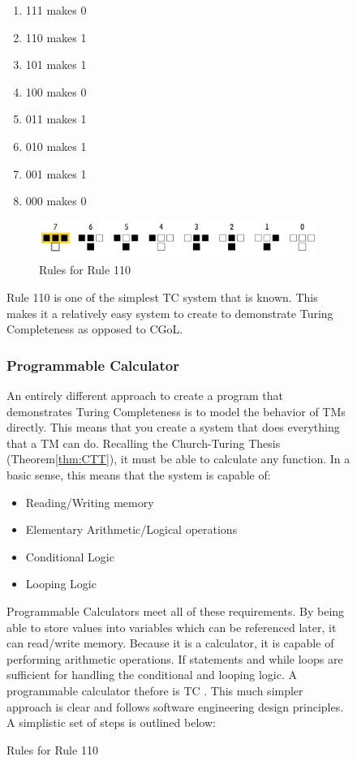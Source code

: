 \begin{figure}[htb]
\begin{enumerate}
    \item 111 makes 0
    \item 110 makes 1
    \item 101 makes 1
    \item 100 makes 0
    \item 011 makes 1
    \item 010 makes 1
    \item 001 makes 1
    \item 000 makes 0
\end{enumerate}

\begin{figure}[htb]
    \centering
    \includegraphics[width=10cm]{images/rule110.png}
       \caption{Rules for Rule 110}
           \label{fig:Rule110}
\end{figure}

Rule 110 is one of the simplest TC system that is known.
This makes it a relatively easy system to create to demonstrate Turing Completeness as opposed to CGoL.

\subsubsection{Programmable Calculator}\label{subsubsec:ProgCalc}

An entirely different approach to create a program that demonstrates Turing Completeness is to model the behavior of TMs directly.
This means that you create a system that does everything that a TM can do.
Recalling the Church-Turing Thesis (Theorem\ref{thm:CTT}), it must be able to calculate any function.
In a basic sense, this means that the system is capable of:

\begin{itemize}
    \item Reading/Writing memory
    \item Elementary Arithmetic/Logical operations
    \item Conditional Logic
    \item Looping Logic
\end{itemize}

Programmable Calculators meet all of these requirements.
By being able to store values into variables which can be referenced later, it can read/write memory.
Because it is a calculator, it is capable of performing arithmetic operations.
If statements and while loops are sufficient for handling the conditional and looping logic.
A programmable calculator thefore is TC \cite{CalcTC}.
This much simpler approach is clear and follows software engineering design principles.
A simplistic set of steps is outlined below:


\end{figure}
